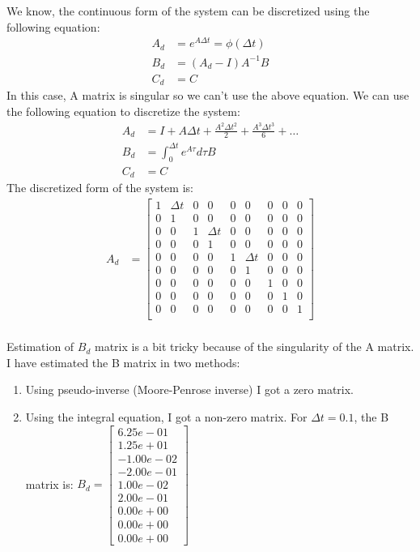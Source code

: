 \documentclass[12pt]{article}
\begin{document}
We know, the continuous form of the system can be discretized using the following equation:
\begin{align*}
    A_d &= e^{A \Delta t}  = \phi(\Delta t) \\
    B_d &= (A_d - I) A^{-1} B \\
    C_d &= C
\end{align*}
In this case, A matrix is singular so we can't use the above equation. We can use the following equation to discretize the system:
\begin{align*}
    A_d &= I + A \Delta t + \frac{A^2 \Delta t^2}{2} + \frac{A^3 \Delta t^3}{6} + \ldots \\
    B_d &= \int_{0}^{\Delta t} e^{A \tau} d\tau B \\
    C_d &= C
\end{align*}
The discretized form of the system is:
\begin{align*}
    A_d &= \begin{bmatrix}
        1 & \Delta t & 0 & 0 & 0 & 0 & 0 & 0 & 0 \\
        0 & 1 & 0 & 0 & 0 & 0 & 0 & 0 & 0 \\
        0 & 0 & 1 & \Delta t & 0 & 0 & 0 & 0 & 0 \\
        0 & 0 & 0 & 1 & 0 & 0 & 0 & 0 & 0 \\
        0 & 0 & 0 & 0 & 1 & \Delta t & 0 & 0 & 0 \\
        0 & 0 & 0 & 0 & 0 & 1 & 0 & 0 & 0 \\
        0 & 0 & 0 & 0 & 0 & 0 & 1 & 0 & 0 \\
        0 & 0 & 0 & 0 & 0 & 0 & 0 & 1 & 0 \\
        0 & 0 & 0 & 0 & 0 & 0 & 0 & 0 & 1 \\
    \end{bmatrix} \\
\end{align*}


\color{black}
Estimation of $B_d$ matrix is a bit tricky because of the singularity of the A matrix. I have estimated the B matrix in two methods:
\begin{enumerate}
    \item Using pseudo-inverse (Moore-Penrose inverse) I got a zero matrix.
    \item Using the integral equation, I got a non-zero matrix. For $\Delta t = 0.1$, the B matrix is: $B_d = \begin{bmatrix}   6.25e-01 \\  1.25e+01 \\ -1.00e-02 \\ -2.00e-01 \\ 1.00e-02 \\ 2.00e-01 \\
        0.00e+00 \\  0.00e+00 \\  0.00e+00 \end{bmatrix}$
\end{enumerate}
\end{document}
